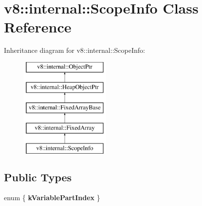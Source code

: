 \hypertarget{classv8_1_1internal_1_1ScopeInfo}{}\section{v8\+:\+:internal\+:\+:Scope\+Info Class Reference}
\label{classv8_1_1internal_1_1ScopeInfo}
Inheritance diagram for v8\+:\+:internal\+:\+:Scope\+Info\+:\begin{figure}[H]
\begin{center}
\leavevmode
\includegraphics[height=5.000000cm]{classv8_1_1internal_1_1ScopeInfo}
\end{center}
\end{figure}
\subsection*{Public Types}
\begin{DoxyCompactItemize}
\item 
\mbox{\label{classv8_1_1internal_1_1ScopeInfo_a8d2437464d8e2d41a467ee9aefcf9343}} 
enum \{ {\bfseries k\+Variable\+Part\+Index}
 \}
\end{DoxyCompactItemize}
